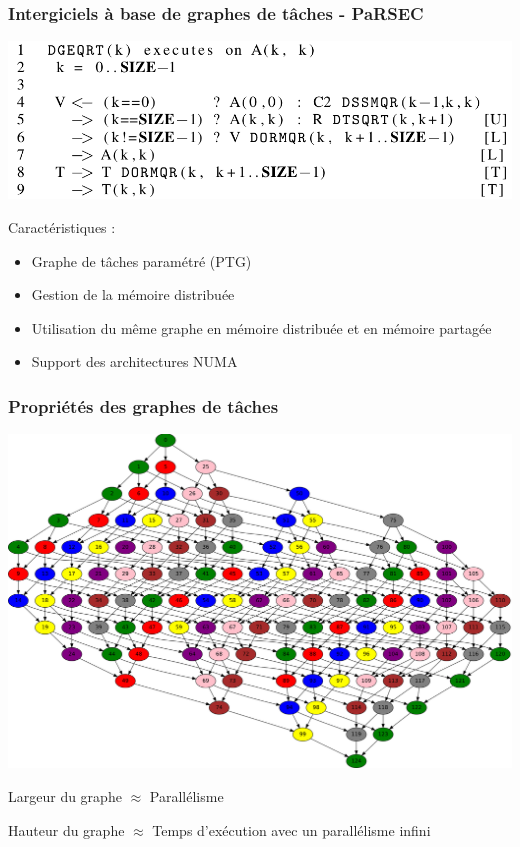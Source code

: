 \documentclass{beamer}
\begin{document}
\begin{frame}
  \frametitle{Intergiciels à base de graphes de tâches - PaRSEC}

  \centerline{\includegraphics[width=0.8\linewidth]{parsec}}

  Caractéristiques :
  \begin{itemize}
    \item Graphe de tâches paramétré (PTG)
    \item Gestion de la mémoire distribuée
    \item Utilisation du même graphe en mémoire distribuée et en mémoire partagée
    \item Support des architectures NUMA
  \end{itemize}
\end{frame}

\begin{frame}
  \frametitle{Propriétés des graphes de tâches}


  \centerline{\includegraphics[width=0.8\linewidth]{graphe_exemple}}


  Largeur du graphe $\approx$ Parallélisme


  Hauteur du graphe $\approx$ Temps d'exécution avec un parallélisme infini
\end{frame}
\end{document}
